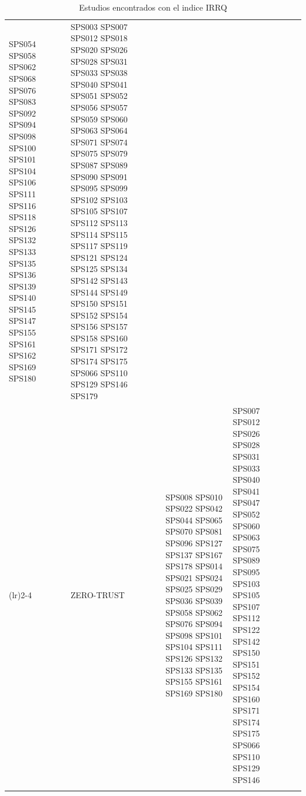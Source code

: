 \begin{table}[htbp]
\begin{tabularx}{\textwidth}{p{0.8cm}p{2.5cm}>{\raggedright\arraybackslash}X>{\raggedright\arraybackslash}X>{\raggedright\arraybackslash}X}
																		 SPS054 SPS058 SPS062 SPS068 SPS076 SPS083 
																		 SPS092 SPS094 SPS098 SPS100 SPS101 SPS104 
																		 SPS106 SPS111 SPS116 SPS118 SPS126 SPS132 
																		 SPS133 SPS135 SPS136 SPS139 SPS140 SPS145 
																		 SPS147 SPS155 SPS161 SPS162 SPS169 SPS180    & SPS003 SPS007 SPS012 SPS018 SPS020 SPS026 
																													   	 SPS028 SPS031 SPS033 SPS038 SPS040 SPS041 
																														 SPS051 SPS052 SPS056 SPS057 SPS059 SPS060 
																														 SPS063 SPS064 SPS071 SPS074 SPS075 SPS079 
																														 SPS087 SPS089 SPS090 SPS091 SPS095 SPS099 
																														 SPS102 SPS103 SPS105 SPS107 SPS112 SPS113 
																														 SPS114 SPS115 SPS117 SPS119 SPS121 SPS124 
																														 SPS125 SPS134 SPS142 SPS143 SPS144 SPS149 
																														 SPS150 SPS151 SPS152 SPS154 SPS156 SPS157 
																														 SPS158 SPS160 SPS171 SPS172 SPS174 SPS175	
																														 SPS066 SPS110 SPS129 SPS146 SPS179                   											\\ 
		\addlinespace[0.3em]
		\cmidrule(lr){2-4}
											 & ZERO-TRUST         	   & SPS008 SPS010 SPS022 SPS042 SPS044 SPS065 
																		 SPS070 SPS081 SPS096 SPS127 SPS137 SPS167 
																		 SPS178 SPS014 SPS021 SPS024 SPS025 SPS029 
																		 SPS036 SPS039 SPS058 SPS062 SPS076 SPS094 
																		 SPS098 SPS101 SPS104 SPS111 SPS126 SPS132 
																		 SPS133 SPS135 SPS155 SPS161 SPS169 SPS180   & SPS007 SPS012 SPS026 SPS028 SPS031 SPS033 
																													   SPS040 SPS041 SPS047 SPS052 SPS060 SPS063 
																													   SPS075 SPS089 SPS095 SPS103 SPS105 SPS107 
																													   SPS112 SPS122 SPS142 SPS150 SPS151 SPS152 
																													   SPS154 SPS160 SPS171 SPS174 SPS175 SPS066 
																													   SPS110 SPS129 SPS146                   											\\
		\bottomrule
		\vspace{2pt}
	\end{tabularx}
	\caption{Estudios encontrados con el indice IRRQ}\label{table:highest_IRRQ}
\end{table}

